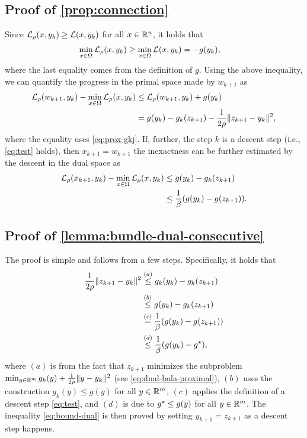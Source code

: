 \documentclass[11pt]{article}
\begin{document}
\subsection{Proof of \cref{prop:connection}}
\label{apx:prop:connection}
Since $ \mathcal{L}_{\rho}(x,y_k) \geq \mathcal{L}(x,y_k)$ for all $x \in \mathbb{R}^n$, it holds that
\begin{align*}
    \min_{x\in \Omega} \mathcal{L}_{\rho}(x,y_k) & \geq \min_{x \in \Omega} \mathcal{L}(x,y_k) = -g(y_k),
\end{align*}
where the last equality comes from the definition of $g$. Using the above inequality, we can quantify the progress in the primal space made by $w_{k+1}$ as
\begin{equation*}
    \begin{aligned}
         \mathcal{L}_{\rho}(w_{k+1},y_k) - \min_{x \in \Omega} \mathcal{L}_{\rho}(x,y_k) 
         &\leq  \mathcal{L}_{\rho}(w_{k+1},y_k) + g(y_k)\\
         &= g(y_k) -g_k(z_{k+1}) - \frac{1}{2\rho }\|z_{k+1} - y_k\|^2,
    \end{aligned}
\end{equation*}
where the equality uses \cref{eq:prox-gkj}. If, further, the step $k$ is a descent step (i.e., \eqref{eq:test} holds), then $x_{k+1} = w_{k+1}$ the inexactness can be further estimated by the descent in the dual space as
\begin{align*}
    \mathcal{L}_{\rho}(x_{k+1},y_k) - \min_{x \in \Omega} \mathcal{L}_{\rho}(x,y_k)&\leq  g(y_k)- g_k(z_{k+1}) \\
    &\leq   \frac{1}{\beta} (g(y_k) - g(z_{k+1})).
\end{align*}
\subsection{Proof of \cref{lemma:bundle-dual-consecutive}}
\label{apx:lemma:bundle-dual-consecutive}
The proof is simple and follows from a few steps. Specifically, it holds that 
    \begin{equation*}
\begin{aligned}
     \frac{1}{2 \rho} \|z_{k+1} - y_k\|^2 & \overset{(a)}{\leq}  g_k(y_{k})  - g_k(z_{k+1}) \\ 
    &\overset{(b)}{\leq} g(y_{k})  - g_k(z_{k+1})  \\
    & \overset{(c)}{=} \frac{1}{\beta} (g(y_{k})-g(z_{k+1})) \\
    & \overset{(d)}{\leq} \frac{1}{\beta} (g(y_{k})-g^\star),
\end{aligned}
 \end{equation*}
  where $(a)$ is from the fact that $z_{k+1}$ minimizes the subproblem $\min_{y \in \mathbb{R}^m} g_k(y) + \frac{1}{2\rho}\|y - y_k\|^2$ (see \cref{eq:dual-bala-proximal}), $(b)$ uses the construction $g_k(y) \leq g(y)$ for all $y \in \mathbb{R}^m$, $(c)$ applies the definition of a descent step \cref{eq:test}, and $(d)$ is due to $g^\star \leq g(y)$ for all $y \in \mathbb{R}^m$. The inequality \eqref{eq:bound-dual} is then proved by setting $y_{k+1} = z_{k+1}$ as a descent step happens. 
   
\end{document}
